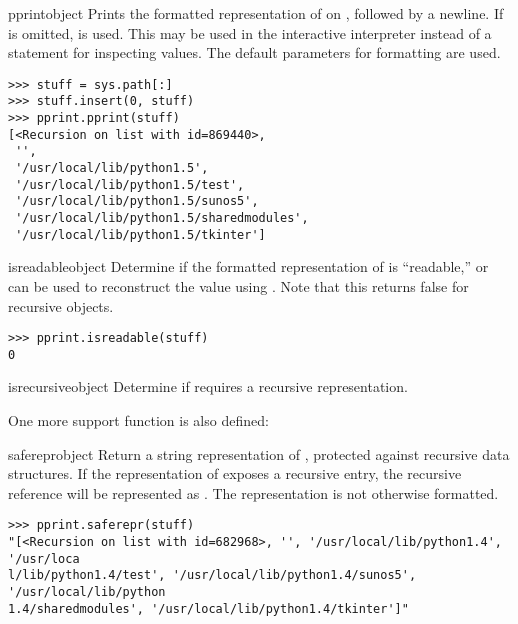 \begin{funcdesc}{pprint}{object}
Prints the formatted representation of  on ,
followed by a newline.  If  is omitted, 
is used.  This may be used in the interactive interpreter instead of a
 statement for inspecting values.  The default
parameters for formatting are used.

\begin{verbatim}
>>> stuff = sys.path[:]
>>> stuff.insert(0, stuff)
>>> pprint.pprint(stuff)
[<Recursion on list with id=869440>,
 '',
 '/usr/local/lib/python1.5',
 '/usr/local/lib/python1.5/test',
 '/usr/local/lib/python1.5/sunos5',
 '/usr/local/lib/python1.5/sharedmodules',
 '/usr/local/lib/python1.5/tkinter']
\end{verbatim}
\end{funcdesc}

\begin{funcdesc}{isreadable}{object}
Determine if the formatted representation of  is
``readable,'' or can be used to reconstruct the value using
.  Note that this returns false for
recursive objects.

\begin{verbatim}
>>> pprint.isreadable(stuff)
0
\end{verbatim}
\end{funcdesc}

\begin{funcdesc}{isrecursive}{object}
Determine if  requires a recursive representation.
\end{funcdesc}


One more support function is also defined:

\begin{funcdesc}{saferepr}{object}
Return a string representation of , protected against
recursive data structures.  If the representation of 
exposes a recursive entry, the recursive reference will be represented
as .  The
representation is not otherwise formatted.

\begin{verbatim}
>>> pprint.saferepr(stuff)
"[<Recursion on list with id=682968>, '', '/usr/local/lib/python1.4', '/usr/loca
l/lib/python1.4/test', '/usr/local/lib/python1.4/sunos5', '/usr/local/lib/python
1.4/sharedmodules', '/usr/local/lib/python1.4/tkinter']"
\end{verbatim}
\end{funcdesc}


